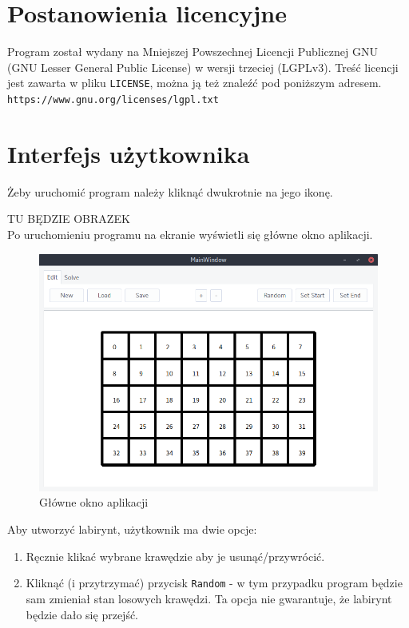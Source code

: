 \documentclass[12pt,a4paper]{article}
\begin{document}
	
	\section{Postanowienia licencyjne}	
	Program został wydany na Mniejszej Powszechnej Licencji Publicznej GNU 
	(GNU Lesser General Public License) w wersji trzeciej (LGPLv3). Treść
	licencji jest zawarta w pliku \texttt{LICENSE}, można ją też znaleźć
	pod poniższym adresem.\\
	\texttt{https://www.gnu.org/licenses/lgpl.txt}

	\section{Interfejs użytkownika}	
	Żeby uruchomić program należy kliknąć dwukrotnie na jego ikonę.	
	
	TU BĘDZIE OBRAZEK	\\

	Po uruchomieniu programu na ekranie wyświetli się główne okno
	aplikacji.	
	\begin{figure}[H]
		\centering
		\includegraphics[width=0.8\linewidth]{obrazki/1.png}
		\caption{Główne okno aplikacji}
	\end{figure}
	
	Aby utworzyć labirynt, użytkownik ma dwie opcje:
	\begin{enumerate}
		\item Ręcznie klikać wybrane krawędzie aby je usunąć/przywrócić.
		\item Kliknąć (i przytrzymać) przycisk \texttt{Random} - w tym
			przypadku program będzie sam zmieniał stan losowych
			krawędzi. Ta opcja nie gwarantuje, że labirynt będzie dało
			się przejść.
	\end{enumerate}
	
\end{document}
